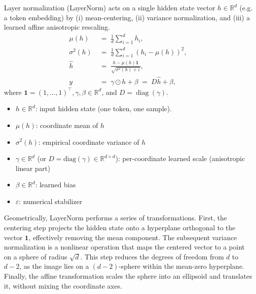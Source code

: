 \documentclass[a4paper,12pt]{article}
\begin{document}
Layer normalization (LayerNorm) acts on a single hidden state vector \(h\in\mathbb{R}^d\) (e.g. a token embedding) by (i) mean-centering, (ii) variance normalization, and (iii) a learned affine anisotropic rescaling.
\begin{align}
\mu(h) &\;=\; \frac{1}{d}\sum_{i=1}^d h_i, \\
\sigma^2(h) &\;=\; \frac{1}{d}\sum_{i=1}^d (h_i-\mu(h))^2, \\
\widehat{h} &\;=\; \frac{h - \mu(h)\mathbf{1}}{\sqrt{\sigma^2(h)+\varepsilon}}, \label{eq:ln_norm}\\
y &\;=\; \gamma \odot \widehat{h} + \beta \;=\; D\widehat{h} + \beta, \label{eq:ln_affine}
\end{align}
where \(\mathbf{1}=(1,\dots,1)^\top , \gamma, \beta \in\mathbb{R}^d\), and \(D=\operatorname{diag}(\gamma)\).


\begin{itemize}
  \item \(h\in\mathbb{R}^d\): input hidden state (one token, one sample).
  \item \(\mu(h)\): coordinate mean of \(h\)
  \item \(\sigma^2(h)\): empirical coordinate variance of \(h\)
  \item \(\gamma\in\mathbb{R}^d\) (or \(D=\mathrm{diag}(\gamma)\in\mathbb{R}^{d\times d}\)): per-coordinate learned scale (anisotropic linear part)
  \item \(\beta\in\mathbb{R}^d\): learned bias
  \item \(\varepsilon\): numerical stabilizer
\end{itemize}

Geometrically, LayerNorm performs a series of transformations. First, the centering step projects the hidden state onto a hyperplane orthogonal to the vector $\mathbf{1}$, effectively removing the mean component. The subsequent variance normalization is a nonlinear operation that maps the centered vector to a point on a sphere of radius $\sqrt{d}$. This step reduces the degrees of freedom from $d$ to $d-2$, as the image lies on a $(d-2)$-sphere within the mean-zero hyperplane. Finally, the affine transformation scales the sphere into an ellipsoid and translates it, without mixing the coordinate axes.
\end{document}
